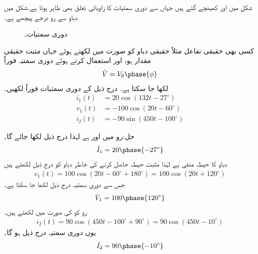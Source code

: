 شکل  میں  اور  کھینچے گئے ہیں جہاں سے دوری سمتیات کا زاویائی تعلق بھی ظاہر ہوتا ہے۔شکل  میں دباو سے رو  درجے پیچھے ہے۔
\begin{figure}
\centering
{}
\caption{دوری سمتیات۔}
\label{شکل_بدلتا_دوری_سمتیات}
\end{figure}

کسی بھی حقیقی تفاعل مثلاً حقیقی دباو کو  صورت میں لکھتے ہوئے جہاں  مثبت حقیقی مقدار ہو،  اور  استعمال کرتے ہوئے دوری سمتیہ فوراً
\begin{align}
\hat{V}=V_0\phase{\phi}
\end{align}
لکھا جا سکتا ہے۔
درج ذیل کے دوری سمتیات فوراً لکھیں۔
\begin{align*}
i_1(t)&=20\cos(132t-27^{\circ}) \\
 v_1(t)&=-100\cos(20t-60^{\circ})\\
 i_2(t)&=-90\sin(450t-100^{\circ})
\end{align*}

حل:رو  میں  اور  ہے لہٰذا درج ذیل لکھا جائے گا۔
\begin{align*}
\hat{I}_1=20\phase{-27^{\circ}}
\end{align*}
دباو کا حیطہ منفی ہے لہٰذا مثبت حیطہ حاصل کرنے کی خاطر دباو کو درج ذیل لکھتے ہیں
\begin{align*}
v_1(t)=100\cos(20t-60^{\circ}+180^{\circ})=100\cos(20t+120^{\circ})
\end{align*}
جس سے دوری سمتیہ درج ذیل لکھا جا سکتا ہے۔
\begin{align*}
\hat{V}_1=100\phase{120^{\circ}}
\end{align*}
رو  کو  کی صورت میں لکھتے ہیں۔
\begin{align*}
i_2(t)=90\cos(450t-100^{\circ}+90^{\circ})=90\cos(450t-10^{\circ})
\end{align*}
یوں دوری سمتیہ درج ذیل ہو گا۔
\begin{align*}
\hat{I}_2=90\phase{-10^{\circ}}
\end{align*}

